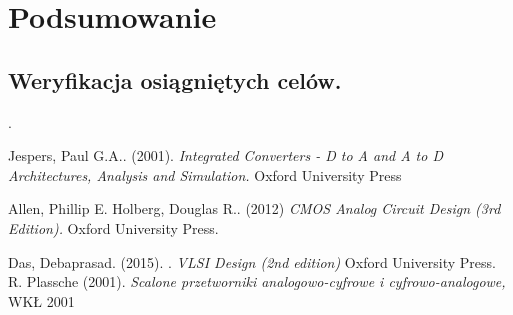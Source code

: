 \documentclass[10pt,a4paper]{report}
\begin{document}
	\chapter{Podsumowanie}
	\section{Weryfikacja osiągniętych celów.}
	
	
	\appendix
.
	\begin{thebibliography}{9}
		Jespers, Paul G.A.. (2001). 
		\textit{Integrated Converters - D to A and A to D Architectures, Analysis and Simulation.}
		Oxford University Press
		
		Allen, Phillip E. Holberg, Douglas R.. (2012)  
		\textit{CMOS Analog Circuit Design (3rd Edition). }
		Oxford University Press.
		
		Das, Debaprasad. (2015). .
		\textit{VLSI Design (2nd edition)}
		Oxford University Press.
		R. Plassche (2001). 
		\textit{Scalone przetworniki analogowo-cyfrowe i cyfrowo-analogowe,}
		WKŁ 2001
	\end{thebibliography}
\end{document}
